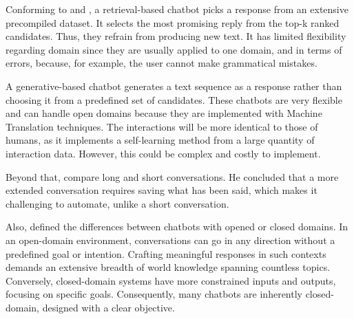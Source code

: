 Conforming to \citet{chizhik_challenges_2020} and \citet{borah_survey_2019}, a retrieval-based chatbot picks a response from an extensive precompiled dataset. It selects the most promising reply from the top-k ranked candidates. Thus, they refrain from producing new text. It has limited flexibility regarding domain since they are usually applied to one domain, and in terms of errors, because, for example, the user cannot make grammatical mistakes.

A generative-based chatbot generates a text sequence as a response rather than choosing it from a predefined set of candidates. These chatbots are very flexible and can handle open domains because they are implemented with Machine Translation techniques. The interactions will be more identical to those of humans, as it implements a self-learning method from a large quantity of interaction data. However, this could be complex and costly to implement.

Beyond that, \citet{borah_survey_2019} compare long and short conversations. He concluded that a more extended conversation requires saving what has been said, which makes it challenging to automate, unlike a short conversation. 

Also, \citet{borah_survey_2019} defined the differences between chatbots with opened or closed domains. In an open-domain environment, conversations can go in any direction without a predefined goal or intention. Crafting meaningful responses in such contexts demands an extensive breadth of world knowledge spanning countless topics. Conversely, closed-domain systems have more constrained inputs and outputs, focusing on specific goals. Consequently, many chatbots are inherently closed-domain, designed with a clear objective.





